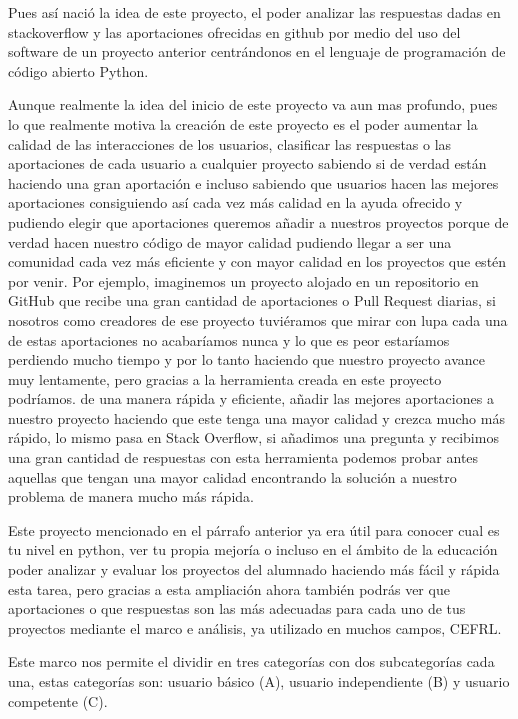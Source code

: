 \documentclass[a4paper, 12pt]{book}
\begin{document}
Pues así nació la idea de este proyecto, el poder analizar las respuestas dadas en stackoverflow y las aportaciones ofrecidas en github por medio del uso del software de un proyecto anterior centrándonos en el lenguaje de programación de código abierto Python.

Aunque realmente la idea del inicio de este proyecto va aun mas profundo, pues lo que realmente motiva la creación de este proyecto es el poder aumentar la calidad de las interacciones de los usuarios, clasificar las respuestas o las aportaciones de cada usuario a cualquier proyecto sabiendo si de verdad están haciendo una gran aportación e incluso sabiendo que usuarios hacen las mejores aportaciones consiguiendo así cada vez más calidad en la ayuda ofrecido y pudiendo elegir que aportaciones queremos añadir a nuestros proyectos porque de verdad hacen nuestro código de mayor calidad pudiendo llegar a ser una comunidad cada vez más eficiente y con mayor calidad en los proyectos que estén por venir. Por ejemplo, imaginemos un proyecto alojado en un repositorio en GitHub que recibe una gran cantidad de aportaciones o Pull Request diarias, si nosotros como creadores de ese proyecto tuviéramos que mirar con lupa cada una de estas aportaciones no acabaríamos nunca y lo que es peor estaríamos perdiendo mucho tiempo y por lo tanto haciendo que nuestro proyecto avance muy lentamente, pero gracias a la herramienta creada en este proyecto podríamos. de una manera rápida y eficiente, añadir las mejores aportaciones a nuestro proyecto haciendo que este tenga una mayor calidad y crezca mucho más rápido, lo mismo pasa en Stack Overflow, si añadimos una pregunta y recibimos una gran cantidad de respuestas con esta herramienta podemos probar antes aquellas que tengan una mayor calidad encontrando la solución a nuestro problema de manera mucho más rápida.

Este proyecto mencionado en el párrafo anterior ya era útil para conocer cual es tu nivel en python, ver tu propia mejoría o incluso en el ámbito de la educación poder analizar y evaluar los proyectos del alumnado haciendo más fácil y rápida esta tarea, pero gracias a esta ampliación ahora también podrás ver que aportaciones o que respuestas son las más adecuadas para cada uno de tus proyectos mediante el marco e análisis, ya utilizado en muchos campos, CEFRL.

Este marco nos permite el dividir en tres categorías con dos subcategorías cada una, estas categorías son: usuario básico (A), usuario independiente (B) y usuario competente (C).
\end{document}
